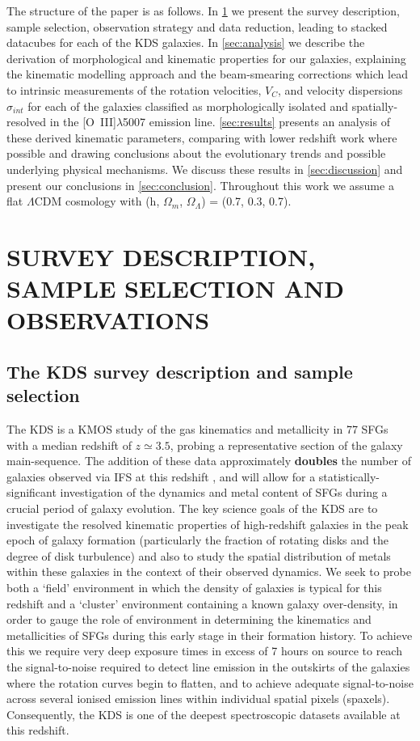 \documentclass[fleqn,usenatbib]{mnras}
\begin{document}
The structure of the paper is as follows.
In \cref{sec:Survey_and_data} we present the survey description, sample selection, observation strategy and data reduction, leading to stacked datacubes for each of the KDS galaxies.
In \cref{sec:analysis} we describe the derivation of morphological and kinematic properties for our galaxies, explaining the kinematic modelling approach and the beam-smearing corrections which lead to intrinsic measurements of the rotation velocities, $V_{C}$, and velocity dispersions $\sigma_{int}$ for each of the galaxies classified as morphologically isolated and spatially-resolved in the [O~{\sc III}]$\lambda$5007 emission line.
\cref{sec:results} presents an analysis of these derived kinematic parameters, comparing with lower redshift work where possible and drawing conclusions about the evolutionary trends and possible underlying physical mechanisms.
We discuss these results in \cref{sec:discussion} and present our conclusions in \cref{sec:conclusion}.
Throughout this work we assume a flat $\Lambda$CDM cosmology with (h, $\Omega_{m}$, $\Omega_{\Lambda}$) = (0.7, 0.3, 0.7). 

\section{SURVEY DESCRIPTION, SAMPLE SELECTION AND OBSERVATIONS}\label{sec:Survey_and_data}
\subsection{The KDS survey description and sample selection}\label{subsec:survey_intro}
The KDS is a KMOS study of the gas kinematics and metallicity in 77 SFGs with a median redshift of $z\simeq3.5$, probing a representative section of the galaxy main-sequence.
The addition of these data approximately \textbf{doubles} the number of galaxies observed via IFS at this redshift \textbf{\citep{Cresci2010,Lemoine-Busserolle2010,Gnerucci2011,Troncoso_2014}}, and will allow for a statistically-significant investigation of the dynamics and metal content of SFGs during a crucial period of galaxy evolution. 
The key science goals of the KDS are to investigate the resolved kinematic properties of high-redshift galaxies in the peak epoch of galaxy formation (particularly the fraction of rotating disks and the degree of disk turbulence) and also to study the spatial distribution of metals within these galaxies in the context of their observed dynamics.
We seek to probe both a `field' environment in which the density of galaxies is typical for this redshift and a `cluster' environment containing a known galaxy over-density, in order to gauge the role of environment in determining the kinematics and metallicities of SFGs during this early stage in their formation history.
To achieve this we require very deep exposure times in excess of 7 hours on source to reach the signal-to-noise required to detect line emission in the outskirts of the galaxies where the rotation curves begin to flatten, and to achieve adequate signal-to-noise across several ionised emission lines within individual spatial pixels (spaxels).
Consequently, the KDS is one of the deepest spectroscopic datasets available at this redshift. 
\end{document}
